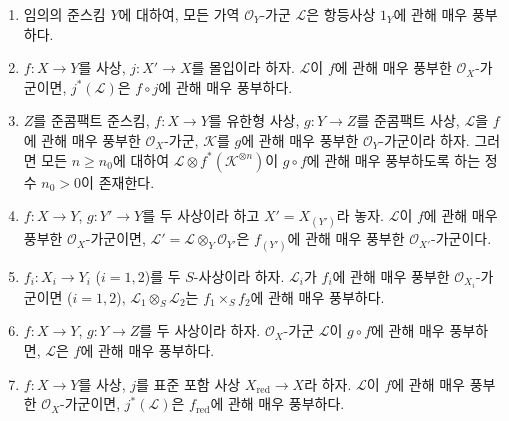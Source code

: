 \begin{proposition}[4.4.10]
\label{II.4.4.10-ko}
\begin{enumerate}
  \item[\rm{(i)}] 임의의 준스킴 $Y$에 대하여, 모든 가역
  $\mathcal{O}_Y$-가군 $\mathcal{L}$은 항등사상 $1_Y$에 관해 매우
  풍부하다.
  \item[\rm{(i bis)}] $f:X\to Y$를 사상, $j:X'\to X$를 몰입이라 하자.
  $\mathcal{L}$이 $f$에 관해 매우 풍부한 $\mathcal{O}_X$-가군이면,
  $j^*(\mathcal{L})$은 $f\circ j$에 관해 매우 풍부하다.
  \item[\rm{(ii)}] $Z$를 준콤팩트 준스킴, $f:X\to Y$를 유한형 사상,
  $g:Y\to Z$를 준콤팩트 사상, $\mathcal{L}$을 $f$에 관해 매우 풍부한
  $\mathcal{O}_X$-가군, $\mathcal{K}$를 $g$에 관해 매우 풍부한
  $\mathcal{O}_Y$-가군이라 하자. 그러면 모든 $n\geq n_0$에 대하여
  $\mathcal{L}\otimes f^*(\mathcal{K}^{\otimes n})$이 $g\circ f$에 관해
  매우 풍부하도록 하는 정수 $n_0>0$이 존재한다.
  \item[\rm{(iii)}] $f:X\to Y$, $g:Y'\to Y$를 두 사상이라 하고
  $X'=X_{(Y')}$라 놓자. $\mathcal{L}$이 $f$에 관해 매우 풍부한
  $\mathcal{O}_X$-가군이면,
  $\mathcal{L}'=\mathcal{L}\otimes_Y\mathcal{O}_{Y'}$은
  $f_{(Y')}$에 관해 매우 풍부한 $\mathcal{O}_{X'}$-가군이다.
  \item[\rm{(iv)}] $f_i:X_i\to Y_i$ ($i=1,2$)를 두 $S$-사상이라 하자.
  $\mathcal{L}_i$가 $f_i$에 관해 매우 풍부한
  $\mathcal{O}_{X_i}$-가군이면 ($i=1,2$),
  $\mathcal{L}_1\otimes_S\mathcal{L}_2$는 $f_1\times_Sf_2$에 관해
  매우 풍부하다.
  \item[\rm{(v)}] $f:X\to Y$, $g:Y\to Z$를 두 사상이라 하자.
  $\mathcal{O}_X$-가군 $\mathcal{L}$이 $g\circ f$에 관해 매우
  풍부하면, $\mathcal{L}$은 $f$에 관해 매우 풍부하다.
  \item[\rm{(vi)}] $f:X\to Y$를 사상, $j$를 표준 포함 사상
  $X_{\mathrm{red}}\to X$라 하자. $\mathcal{L}$이 $f$에 관해 매우
  풍부한 $\mathcal{O}_X$-가군이면, $j^*(\mathcal{L})$은
  $f_{\mathrm{red}}$에 관해 매우 풍부하다.
\end{enumerate}
\end{proposition}

